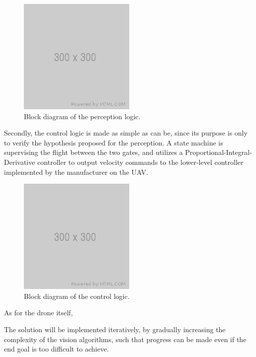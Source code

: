 \begin{figure}[h]
	\centering
	\includegraphics[width=0.5\textwidth]{figure/300x300.png}
	\caption{Block diagram of the perception logic.}
	\label{fig:iros}
\end{figure}

Secondly, the control logic is made as simple as can be, since its purpose is
only to verify the hypothesis proposed for the perception. A state machine is
supervising the flight between the two gates, and utilizes a
Proportional-Integral-Derivative controller to output velocity commands to the
lower-level controller implemented by the manufacturer on the UAV.\\

\begin{figure}[h]
	\centering
	\includegraphics[width=0.5\textwidth]{figure/300x300.png}
	\caption{Block diagram of the control logic.}
	\label{fig:iros}
\end{figure}


As for the drone itself, 

The solution will be implemented iteratively, by gradually increasing the
complexity of the vision algorithms, such that progress can be made even if the
end goal is too difficult to achieve.\\

